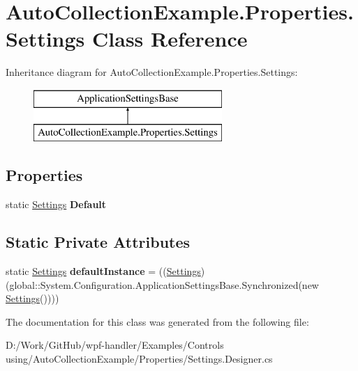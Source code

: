 \hypertarget{class_auto_collection_example_1_1_properties_1_1_settings}{}\section{Auto\+Collection\+Example.\+Properties.\+Settings Class Reference}
\label{class_auto_collection_example_1_1_properties_1_1_settings}
Inheritance diagram for Auto\+Collection\+Example.\+Properties.\+Settings\+:\begin{figure}[H]
\begin{center}
\leavevmode
\includegraphics[height=2.000000cm]{d6/d29/class_auto_collection_example_1_1_properties_1_1_settings}
\end{center}
\end{figure}
\subsection*{Properties}
\begin{DoxyCompactItemize}
\item 
\mbox{\label{class_auto_collection_example_1_1_properties_1_1_settings_ad9f8780bc8f7a87c83709980d0181842}} 
static \mbox{\hyperlink{class_auto_collection_example_1_1_properties_1_1_settings}{Settings}} {\bfseries Default}
\end{DoxyCompactItemize}
\subsection*{Static Private Attributes}
\begin{DoxyCompactItemize}
\item 
\mbox{\label{class_auto_collection_example_1_1_properties_1_1_settings_ac566c94c491a9e723569d9a2e4f51b70}} 
static \mbox{\hyperlink{class_auto_collection_example_1_1_properties_1_1_settings}{Settings}} {\bfseries default\+Instance} = ((\mbox{\hyperlink{class_auto_collection_example_1_1_properties_1_1_settings}{Settings}})(global\+::\+System.\+Configuration.\+Application\+Settings\+Base.\+Synchronized(new \mbox{\hyperlink{class_auto_collection_example_1_1_properties_1_1_settings}{Settings}}())))
\end{DoxyCompactItemize}


The documentation for this class was generated from the following file\+:\begin{DoxyCompactItemize}
\item 
D\+:/\+Work/\+Git\+Hub/wpf-\/handler/\+Examples/\+Controls using/\+Auto\+Collection\+Example/\+Properties/Settings.\+Designer.\+cs\end{DoxyCompactItemize}
